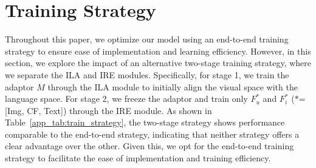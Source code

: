 \documentclass[sigconf]{acmart}
\begin{document}
\section{Training Strategy}
\label{app_sec:train_strategy}
Throughout this paper, we optimize our model using an end-to-end training strategy to ensure ease of implementation and learning efficiency. However, in this section, we explore the impact of an alternative two-stage training strategy, where we separate the ILA and IRE modules. Specifically, for stage 1, we train the adaptor $M$ through the ILA module to initially align the visual space with the language space. For stage 2, we freeze the adaptor and train only $F_u^*$ and $F_i^*$ ($*$=[\textsf{Img}, \textsf{CF}, \textsf{Text}]) through the IRE module. As shown in Table~\ref{app_tab:train_strategy}, the two-stage strategy shows performance comparable to the end-to-end strategy, indicating that neither strategy offers a clear advantage over the other. Given this, we opt for the end-to-end training strategy to facilitate the ease of implementation and training efficiency.







\begin{table}[h]
\caption{Training Strategy.}
\vspace{-2ex}
\label{app_tab:train_strategy}
\end{table}





\end{document}
